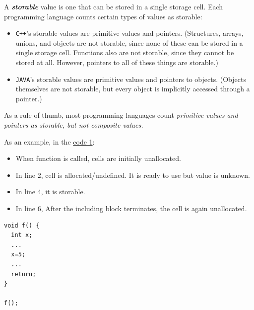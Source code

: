A \textit{\textbf{storable}} value is one that can be stored in a single storage cell. Each programming language counts certain types of values as storable:
\begin{itemize}
  \item \texttt{C++}'s storable values are primitive values and pointers. (Structures, arrays, unions, and objects are not storable, since none of these can be stored in a single storage cell. Functions also are not storable, since they cannot be stored at all. However, pointers to all of these things are storable.)
  \item \texttt{JAVA}'s storable values are primitive values and pointers to objects. (Objects themselves are not storable, but every object is implicitly accessed through a pointer.)
\end{itemize}

As a rule of thumb, most programming languages count \textit{primitive values and pointers as storable, but not composite values.}

As an example, in the \hyperref[code:code-1]{code 1}:
\begin{itemize}
  \item When function is called, cells are initially unallocated.
  \item In line 2, cell is allocated/undefined. It is ready to use but value is unknown.
  \item In line 4, it is storable.
  \item In line 6, After the including block terminates, the cell is again unallocated.
\end{itemize}

\begin{listing}[H]
\begin{verbatim}
void f() {
  int x;
  ...
  x=5;
  ...
  return;
}

f();
\end{verbatim}
\caption{}
\label{code:code-1}
\end{listing}

